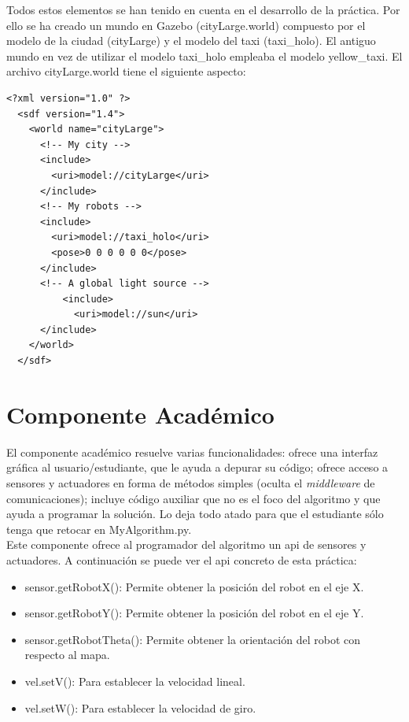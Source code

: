 Todos estos elementos se han tenido en cuenta en el desarrollo de la práctica. Por ello se ha creado un mundo en Gazebo (cityLarge.world) compuesto por el modelo de la ciudad (cityLarge) y el modelo del taxi (taxi\_holo). El antiguo mundo en vez de utilizar el modelo taxi\_holo empleaba el modelo yellow\_taxi. El archivo cityLarge.world tiene el siguiente aspecto:

\vspace{20pt}
	\begin{lstlisting}[frame=single]
<?xml version="1.0" ?>
  <sdf version="1.4">
    <world name="cityLarge">
      <!-- My city -->
      <include>
        <uri>model://cityLarge</uri>
      </include>
      <!-- My robots -->
      <include>
        <uri>model://taxi_holo</uri>
        <pose>0 0 0 0 0 0</pose>
      </include>
      <!-- A global light source -->
          <include>
            <uri>model://sun</uri>
      </include>
    </world>
  </sdf>

	\end{lstlisting}

\section{Componente Académico}
El componente académico resuelve varias funcionalidades: ofrece una interfaz gráfica al usuario/estudiante, que le ayuda a depurar su código; ofrece acceso a sensores y actuadores en forma de métodos simples (oculta el \textit{middleware} de comunicaciones); incluye código auxiliar que no es el foco del algoritmo y que ayuda a programar la solución. Lo deja todo atado para que el estudiante sólo tenga que retocar en MyAlgorithm.py.\\

Este componente ofrece al programador del algoritmo un \acrfull{api} de sensores y actuadores. A continuación se puede ver el \acrshort{api} concreto de esta práctica:

\begin{itemize}
\item sensor.getRobotX(): Permite obtener la posición del robot en el eje X.
\item sensor.getRobotY(): Permite obtener la posición del robot en el eje Y.
\item sensor.getRobotTheta(): Permite obtener la orientación del robot con respecto al mapa.
\item vel.setV(): Para establecer la velocidad lineal.
\item vel.setW(): Para establecer la velocidad de giro.
\end{itemize}


